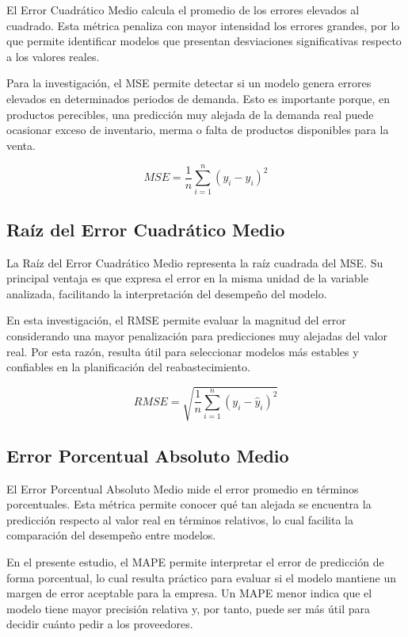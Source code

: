 El Error Cuadrático Medio calcula el promedio de los errores elevados al cuadrado. Esta métrica penaliza con mayor intensidad los errores grandes, por lo que permite identificar modelos que presentan desviaciones significativas respecto a los valores reales.

Para la investigación, el MSE permite detectar si un modelo genera errores elevados en determinados periodos de demanda. Esto es importante porque, en productos perecibles, una predicción muy alejada de la demanda real puede ocasionar exceso de inventario, merma o falta de productos disponibles para la venta.

\begin{equation}
MSE = \frac{1}{n}\sum_{i=1}^{n}(y_i-\hat{y}_i)^2
\end{equation}

\subsection{Raíz del Error Cuadrático Medio}

La Raíz del Error Cuadrático Medio representa la raíz cuadrada del MSE. Su principal ventaja es que expresa el error en la misma unidad de la variable analizada, facilitando la interpretación del desempeño del modelo.

En esta investigación, el RMSE permite evaluar la magnitud del error considerando una mayor penalización para predicciones muy alejadas del valor real. Por esta razón, resulta útil para seleccionar modelos más estables y confiables en la planificación del reabastecimiento.

\begin{equation}
RMSE = \sqrt{\frac{1}{n}\sum_{i=1}^{n}(y_i-\hat{y}_i)^2}
\end{equation}

\subsection{Error Porcentual Absoluto Medio}

El Error Porcentual Absoluto Medio mide el error promedio en términos porcentuales. Esta métrica permite conocer qué tan alejada se encuentra la predicción respecto al valor real en términos relativos, lo cual facilita la comparación del desempeño entre modelos.

En el presente estudio, el MAPE permite interpretar el error de predicción de forma porcentual, lo cual resulta práctico para evaluar si el modelo mantiene un margen de error aceptable para la empresa. Un MAPE menor indica que el modelo tiene mayor precisión relativa y, por tanto, puede ser más útil para decidir cuánto pedir a los proveedores.

